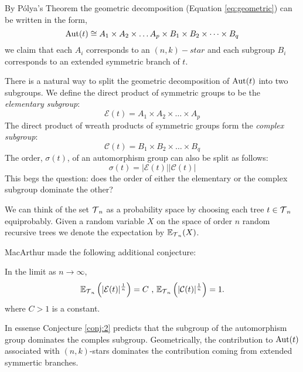 By P\'{o}lya's Theorem the geometric decomposition (Equation \ref{eq:geometric}) can be written in the form,
\begin{equation}
 \operatorname{Aut}(t) \cong A_1 \times A_2 \times \dots A_p \times B_1 \times B_2 \times \dots \times B_q  
\end{equation}
we claim that each $A_i$ corresponds to an $(n,k)-star$ and each subgroup $B_i$ corresponds to an extended symmetric branch of 
$t$.

There is a natural way to split the geometric decomposition of $\operatorname{Aut}(t)$ into two subgroups. We define the direct product of symmetric groups to be the  \emph{elementary subgroup}:
\[
 \mathcal{E}(t) = A_{1} \times A_2 \times \dots\times A_p
\]
The direct product of wreath products of symmetric groups form the \emph{complex subgroup}:
\[
 \mathcal{C}(t) =  B_1 \times B_2 \times \dots \times B_q
\]
The order, $\sigma(t)$, of an automorphism group can also be split as follows:
\[
\sigma(t)  =  \lvert \mathcal{E}(t) \rvert\lvert \mathcal{C}(t)\rvert 
\]
This begs the question: does the order of either the elementary or the complex subgroup dominate the other?  

We can think of the set $\operatorname{\mathcal{T}}_n$ as a probability space by choosing each tree $t \in \operatorname{\mathcal{T}}_n$ equiprobably.  Given a random variable 
$X$ on the space of order $n$ random recursive trees we denote the expectation by $\mathbb{E}_{\operatorname{\mathcal{T}}_n}(X)$.   

MacArthur \cite{macarthur} made the following additional conjecture:
\begin{con}\label{conj:2}
 In the limit as $n \rightarrow \infty$, 
 \[
\mathbb{E}_{\operatorname{\mathcal{T}}_n}\left(  \lvert \mathcal{E}(t)\rvert^{\frac{1}{n}} \right) = C  \text{         ,         }
\mathbb{E}_{\operatorname{\mathcal{T}}_n}\left(\lvert \mathcal{C}(t)\rvert^{\frac{1}{n}} \right) = 1.
\]
where $C>1$ is a constant.
\end{con}
In essense Conjecture \ref{conj:2} predicts that the subgroup of the automorphism group dominates the comples subgroup.  Geometrically, 
the contribution to $\operatorname{Aut}(t)$ associated with $(n,k)$-stars dominates the contribution coming from extended symmertic branches.  

